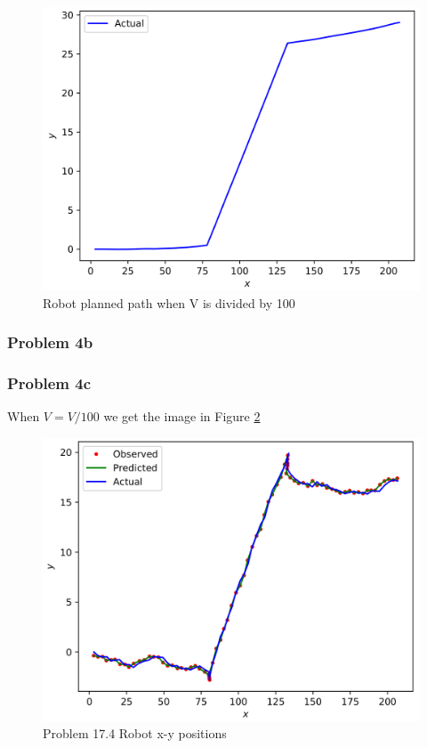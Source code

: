 \documentclass{article}
\begin{document}
\begin{figure}[h]
    \centering
    \includegraphics[scale=0.75]{problem17_4a_Vnoise_good}
    \caption[Problem 17.4 Robot Planned Path]{Robot planned path when V is divided by 100}
    \label{fig:p17_4a_vnoise_good}
\end{figure}

\subsubsection{Problem 4b}


\subsubsection{Problem 4c}
When $V = V / 100$ we get the image in Figure \ref{fig:p17_4a_xy}
\begin{figure}[h]
    \centering
    \includegraphics[scale=0.75]{problem17_4a_xy}
    \caption{Problem 17.4 Robot x-y positions}
    \label{fig:p17_4a_xy}
\end{figure}
\end{document}
